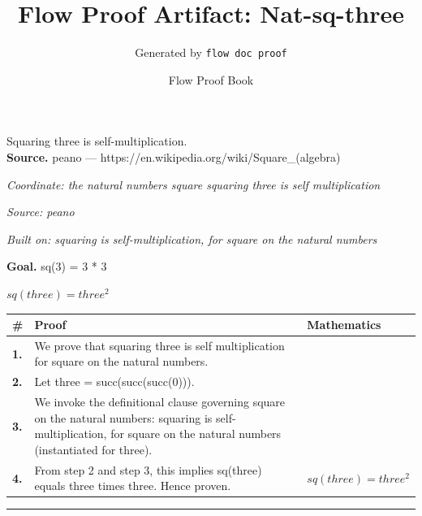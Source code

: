\documentclass[11pt]{article}
\title{Flow Proof Artifact: Nat-sq-three}
\author{Generated by \texttt{flow doc proof}}
\date{Flow Proof Book}
\theoremstyle{definition}
\begin{document}
\maketitle
Squaring three is self-multiplication.\\[0.5em]
\textbf{Source.} peano — https://en.wikipedia.org/wiki/Square\_(algebra)\\[0.5em]
\bigskip
{}\par
\smallskip\noindent\textit{Coordinate: the natural numbers \cdot square \cdot squaring three is self multiplication}\par
\smallskip\noindent\textit{Source: peano}\par
\smallskip\noindent\textit{Built on: squaring is self-multiplication, for square on the natural numbers}\par
\medskip
\noindent\textbf{Goal.} sq(3) = 3 * 3\par
\noindent$\displaystyle sq(three) = three^{2}$\par
\medskip
\noindent
\begin{tabular}{@{} >{\raggedright\arraybackslash}p{} >{\raggedright\arraybackslash}p{} >{\raggedleft\arraybackslash}p{} @{}}
\textbf{\#} & \textbf{Proof} & \textbf{Mathematics} \\
\midrule
\textbf{1.} & We prove that squaring three is self multiplication for square on the natural numbers. & \\[0.45em]
\textbf{2.} & Let three = succ(succ(succ(0))). & \\[0.45em]
\textbf{3.} & We invoke the definitional clause governing square on the natural numbers: squaring is self-multiplication, for square on the natural numbers (instantiated for three). & \\[0.45em]
\textbf{4.} & From step 2 and step 3, this implies sq(three) equals three times three. Hence proven. & $\displaystyle sq(three) = three^{2}$ \\[0.45em]
\bottomrule
\end{tabular}
\label{thm:Nat-square-squaring_three_is_self_multiplication}
\par\medskip\hrule
\end{document}
